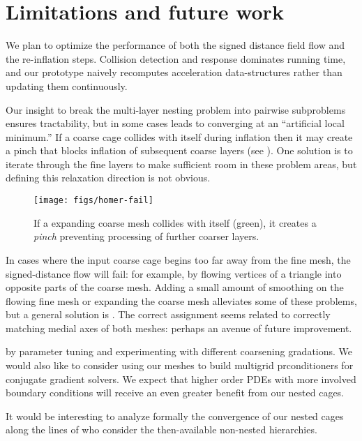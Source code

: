 \section{Limitations and future work}
\label{sec:conclusion}
%
We plan to optimize the performance of both the signed distance field flow and
the re-inflation steps.
%
Collision detection and response dominates running time, and our prototype
naively recomputes acceleration data-structures rather than updating them
continuously.

Our insight to break the multi-layer nesting problem into pairwise subproblems
ensures tractability, but in some cases leads to converging at an
``artificial local minimum.'' If a coarse cage collides with itself during
inflation then it may create a pinch that blocks inflation of subsequent coarse
layers (see ).
%
One solution is to iterate through the fine layers to make sufficient room in
these problem areas, but defining this relaxation direction is not obvious.

\begin{figure}
  \texttt{[image: figs/homer-fail]}
  \caption{If a expanding coarse mesh collides with itself (green), it creates
  a \emph{pinch} preventing processing of further coarser layers.}
  \label{fig:homer}
\end{figure}

In cases where the input coarse cage begins too far away from the fine mesh,
the signed-distance flow will fail: for example, by flowing vertices of a
triangle into opposite parts of the coarse mesh. 
%
Adding a small amount of smoothing on the flowing fine mesh or expanding the
coarse mesh alleviates some of these problems, but a general solution is
.
%
The correct assignment seems related to correctly matching medial axes of both
meshes: perhaps an avenue of future improvement.

 by parameter tuning and experimenting with different coarsening
gradations. We would also like to consider using our meshes to build
multigrid prconditioners for conjugate gradient solvers.
%
We expect that higher order PDEs with more involved boundary conditions will
receive an even greater benefit from our nested cages.

It would be interesting to analyze formally the convergence of our nested cages
along the lines of \cite{chan1996convergence} who consider the then-available
non-nested hierarchies.

